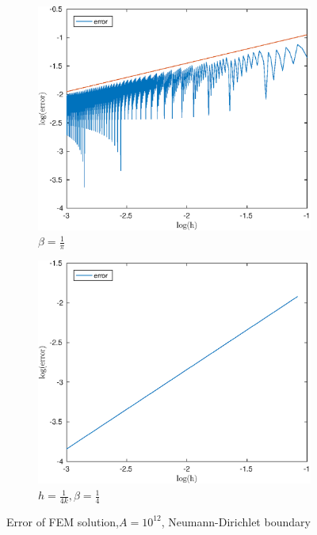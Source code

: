 \documentclass[12pt]{article}
\begin{document}
\begin{figure}[h!]
\centering
\begin{subfigure}{0.4\textwidth}
\includegraphics[width=\textwidth]{error-pi-ND-12}
\caption{$\beta=\frac{1}{\pi}$}
\end{subfigure}
\hfill
\begin{subfigure}{0.4\textwidth}
\includegraphics[width=\textwidth]{error-4-ND-12}
\caption{$h=\frac{1}{4k},\beta=\frac{1}{4}$}
\end{subfigure}
\caption{Error of FEM solution,$A=10^{12}$, Neumann-Dirichlet boundary}
\end{figure}
\end{document}
